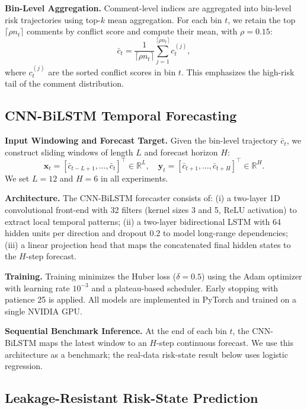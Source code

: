 \documentclass[11pt,a4paper]{article}
\begin{document}
\textbf{Bin-Level Aggregation.} Comment-level indices are aggregated into bin-level risk trajectories using top-$k$ mean aggregation. For each bin $t$, we retain the top $\lceil \rho n_t \rceil$ comments by conflict score and compute their mean, with $\rho = 0.15$:
\begin{equation}
\bar{c}_t = \frac{1}{\lceil \rho n_t \rceil} \sum_{j=1}^{\lceil \rho n_t \rceil} c_t^{(j)},
\label{eq:topk_agg}
\end{equation}
where $c_t^{(j)}$ are the sorted conflict scores in bin $t$. This emphasizes the high-risk tail of the comment distribution.

\subsection{CNN-BiLSTM Temporal Forecasting}

\textbf{Input Windowing and Forecast Target.} Given the bin-level trajectory $\bar{c}_t$, we construct sliding windows of length $L$ and forecast horizon $H$:
\begin{equation}
\mathbf{x}_t = [\bar{c}_{t-L+1}, \dots, \bar{c}_t]^\top \in \mathbb{R}^L,
\quad
\mathbf{y}_t = [\bar{c}_{t+1}, \dots, \bar{c}_{t+H}]^\top \in \mathbb{R}^H.
\label{eq:lstm_input_window}
\end{equation}
We set $L=12$ and $H=6$ in all experiments.

\textbf{Architecture.} The CNN-BiLSTM forecaster consists of: (i) a two-layer 1D convolutional front-end with 32 filters (kernel sizes 3 and 5, ReLU activation) to extract local temporal patterns; (ii) a two-layer bidirectional LSTM with 64 hidden units per direction and dropout 0.2 to model long-range dependencies; (iii) a linear projection head that maps the concatenated final hidden states to the $H$-step forecast.

\textbf{Training.} Training minimizes the Huber loss ($\delta=0.5$) using the Adam optimizer with learning rate $10^{-3}$ and a plateau-based scheduler. Early stopping with patience 25 is applied. All models are implemented in PyTorch and trained on a single NVIDIA GPU.

\textbf{Sequential Benchmark Inference.} At the end of each bin $t$, the CNN-BiLSTM maps the latest window to an $H$-step continuous forecast. We use this architecture as a benchmark; the real-data risk-state result below uses logistic regression.

\subsection{Leakage-Resistant Risk-State Prediction}
\end{document}
